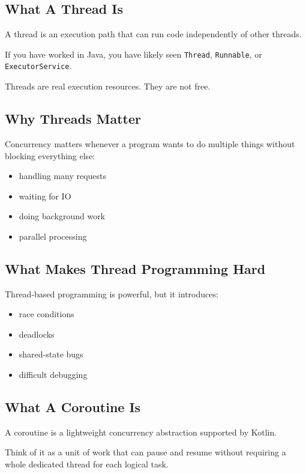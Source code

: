 \documentclass[11pt,a4paper]{article}
\begin{document}
\subsection{What A Thread Is}

A thread is an execution path that can run code independently of other threads.

If you have worked in Java, you have likely seen \texttt{Thread}, \texttt{Runnable}, or \texttt{ExecutorService}.

Threads are real execution resources. They are not free.

\subsection{Why Threads Matter}

Concurrency matters whenever a program wants to do multiple things without blocking everything else:
\begin{itemize}
    \item handling many requests
    \item waiting for IO
    \item doing background work
    \item parallel processing
\end{itemize}

\subsection{What Makes Thread Programming Hard}

Thread-based programming is powerful, but it introduces:
\begin{itemize}
    \item race conditions
    \item deadlocks
    \item shared-state bugs
    \item difficult debugging
\end{itemize}

\subsection{What A Coroutine Is}

A coroutine is a lightweight concurrency abstraction supported by Kotlin.

Think of it as a unit of work that can pause and resume without requiring a whole dedicated thread for each logical task.
\end{document}
